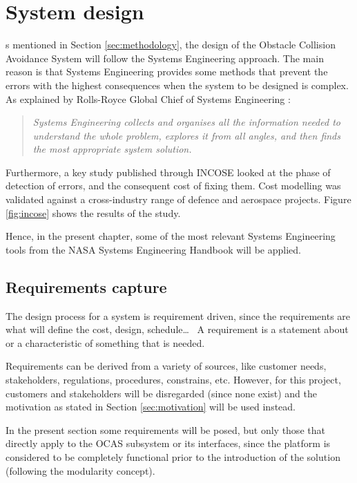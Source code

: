 
\let\textcircled=\pgftextcircled
\chapter{System design}	\label{chap:design}

s mentioned in Section \ref{sec:methodology}, the design of the Obstacle Collision Avoidance System will follow the Systems Engineering approach.
The main reason is that Systems Engineering provides some methods that prevent the errors with the highest consequences when the system to be designed is complex.
As explained by Rolls-Royce Global Chief of Systems Engineering \cite{beasley2015}:
\begin{quote}
	\itshape
	Systems Engineering collects and organises all the information needed to understand the whole problem, explores it from all angles, and then finds the most appropriate system solution.
\end{quote}

Furthermore, a key study published through INCOSE \cite{incoseuk2016} looked at the phase of detection of errors, and the consequent cost of fixing them.
Cost modelling was validated against a cross-industry range of defence and aerospace projects.
Figure \ref{fig:incose} shows the results of the study.



Hence, in the present chapter, some of the most relevant Systems Engineering tools from the NASA Systems Engineering Handbook \cite{nationalaeronauticsandspaceadministration2007} will be applied.


\section{Requirements capture} \label{sec:sysReqs}

The design process for a system is requirement driven, since the requirements are what will define the cost, design, schedule\ldots\ %
A requirement is a statement about or a characteristic of something that is needed.

Requirements can be derived from a variety of sources, like customer needs, stakeholders, regulations, procedures, constrains, etc.
However, for this project, customers and stakeholders will be disregarded (since none exist) and the motivation as stated in Section \ref{sec:motivation} will be used instead.

In the present section some requirements will be posed, but only those that directly apply to the OCAS subsystem or its interfaces, since the platform is considered to be completely functional prior to the introduction of the solution (following the modularity concept).

